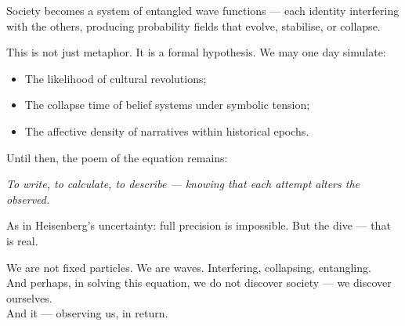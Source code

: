 Society becomes a system of entangled wave functions — each identity interfering with the others, producing probability fields that evolve, stabilise, or collapse.

This is not just metaphor. It is a formal hypothesis. We may one day simulate:
\begin{itemize}
  \item The likelihood of cultural revolutions;
  \item The collapse time of belief systems under symbolic tension;
  \item The affective density of narratives within historical epochs.
\end{itemize}

Until then, the poem of the equation remains:

\textit{To write, to calculate, to describe — knowing that each attempt alters the observed.}

As in Heisenberg’s uncertainty: full precision is impossible. But the dive — that is real.

We are not fixed particles. We are waves. Interfering, collapsing, entangling.\\
And perhaps, in solving this equation, we do not discover society — we discover ourselves.\\
And it — observing us, in return.

